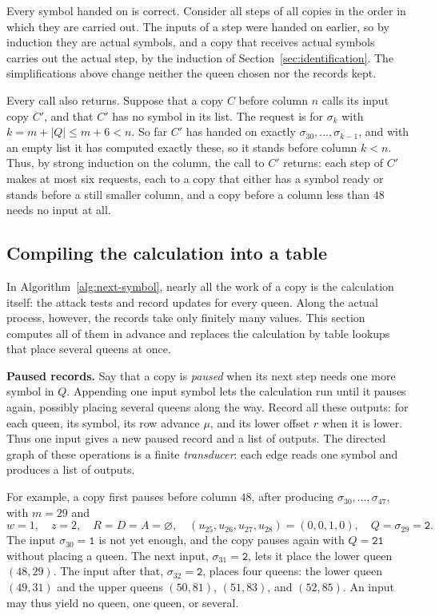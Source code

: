Every symbol handed on is correct. Consider all steps of all copies
in the order in which they are carried out. The inputs of a step were
handed on earlier, so by induction they are actual symbols, and a
copy that receives actual symbols carries out the actual step, by the
induction of Section~\ref{sec:identification}. The simplifications
above change neither the queen chosen nor the records kept.

Every call also returns. Suppose that a copy $C$ before column $n$
calls its input copy $C'$, and that $C'$ has no symbol in its list.
The request is for $\sigma_k$ with $k=m+|Q|\le m+6<n$. So far $C'$
has handed on exactly $\sigma_{30},\dots,\sigma_{k-1}$, and with an
empty list it has computed exactly these, so it stands before
column $k<n$. Thus, by strong induction on the column, the call to
$C'$ returns: each step of $C'$ makes at most six requests, each to a
copy that either has a symbol ready or stands before a still smaller
column, and a copy before a column less than
$48$ needs no input at all.

\subsection{Compiling the calculation into a table}\label{sec:block-transducer}

In Algorithm~\ref{alg:next-symbol}, nearly all the work of a copy is
the calculation itself: the attack tests and record updates for every
queen. Along the actual process, however, the records take only
finitely many values. This section computes all of them in advance and
replaces the calculation by table lookups that place several queens
at once.

\medskip\noindent
\textbf{Paused records.}
Say that a copy is \emph{paused} when its next step needs one more
symbol in $Q$. Appending one input symbol lets the calculation run
until it pauses again, possibly placing several queens along the
way. Record all these outputs: for each queen, its symbol, its row
advance $\mu$, and its lower offset $r$ when it is lower. Thus one
input gives a new paused record and a list of outputs. The directed
graph of these operations is a finite \emph{transducer}: each edge
reads one symbol and produces a list of outputs.

For example, a copy first pauses before column $48$, after producing
$\sigma_{30},\dots,\sigma_{47}$, with $m=29$ and
\[
 w=1,\quad z=2,\quad R=D=A=\varnothing,\quad
 (u_{25},u_{26},u_{27},u_{28})=(0,0,1,0),\quad Q=\sigma_{29}=\mathtt{2}.
\]
The input $\sigma_{30}=\mathtt{1}$ is not yet enough, and the copy
pauses again with $Q=\mathtt{21}$ without placing a queen. The next
input, $\sigma_{31}=\mathtt{2}$, lets it place the lower queen
$(48,29)$. The input after that, $\sigma_{32}=\mathtt{2}$, places four
queens: the lower queen $(49,31)$ and the upper queens $(50,81)$,
$(51,83)$, and $(52,85)$. An input may thus yield no queen, one queen,
or several.

